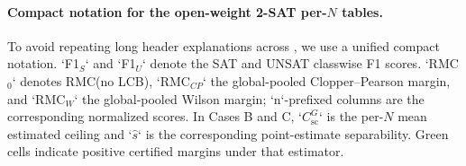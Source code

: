 \documentclass[conference]{IEEEtran}
\theoremstyle{remark}
\newcommand{\shortcutCeiling}{C_{\mathrm{sc}}^{G}}
\begin{document}
\paragraph{Compact notation for the open-weight 2-SAT per-$N$ tables.}
To avoid repeating long header explanations across , we use a unified compact notation.
`F1$_S$` and `F1$_U$` denote the SAT and UNSAT classwise F1 scores.
`RMC$_0$` denotes RMC(no LCB), `RMC$_{CP}$` the global-pooled Clopper--Pearson margin, and `RMC$_W$` the global-pooled Wilson margin; `n`-prefixed columns are the corresponding normalized scores.
In Cases B and C, `$\shortcutCeiling$` is the per-$N$ mean estimated ceiling and `$\hat{s}$` is the corresponding point-estimate separability.
Green cells indicate positive certified margins under that estimator.
\end{document}
